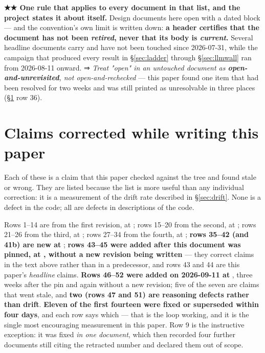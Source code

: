 \documentclass[10.5pt]{article}
\begin{document}
\begin{warnbox}\small
\textbf{★★ One rule that applies to every document in that list, and the project states it about
itself.} Design documents here open with a dated  block — and the convention's own
limit is written down: \textbf{a  header certifies that the document has not
been \emph{retired}, never that its body is \emph{current}.} Several headline documents carry
 and have not been touched since 2026-07-31, while the campaign that produced every
result in \S\ref{sec:ladder} through \S\ref{sec:llmwall} ran from 2026-08-11 onward. ⇒ \emph{Treat
"open" in an untouched document as \textbf{open-and-unrevisited}, not open-and-rechecked} — this
paper found one item that had been resolved for two weeks and was still printed as unresolvable in
three places (\S\ref{sec:corrections} row 36).
\end{warnbox}

\section{Claims corrected while writing this paper}
\label{sec:corrections}

Each of these is a claim that this paper checked against the tree and found stale or wrong. They
are listed because the list is more useful than any individual correction: it is a measurement of
the drift rate described in \S\ref{sec:drift}. None is a defect in the code; all are defects in
descriptions of the code.

Rows 1--14 are from the first revision, at ; rows 15--20 from the second, at
; rows 21--26 from the third, at ; rows 27--34 from the fourth, at
; \textbf{rows 35--42 (and 41b) are new at }; \textbf{rows 43--45
were added after this document was pinned, at , without a new revision being
written} --- they correct claims in the text above rather than in a predecessor, and rows 43 and
44 are this paper's \emph{headline} claims. \textbf{Rows 46--52 were added on 2026-09-11 at
}, three weeks after the pin and again without a new revision; five of the seven
are claims that went stale, and \textbf{two (rows 47 and 51) are reasoning defects rather than
drift}. \textbf{Eleven of the first
fourteen were fixed or superseded within four days}, and each row says which — that is the loop
working, and it is the single most encouraging measurement in this paper. Row 9 is the
instructive exception: it was fixed \emph{in one document}, which then recorded four further
documents still citing the retracted number and declared them out of scope.
\end{document}
